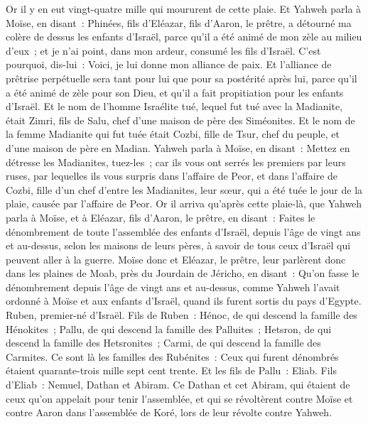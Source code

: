 \begin{multicols}{2}
Or il y en eut vingt-quatre mille qui moururent de cette plaie.
Et Yahweh parla à Moïse, en disant~:
Phinées, fils d'Eléazar, fils d'Aaron, le prêtre, a détourné ma colère de dessus les enfants d'Israël, parce qu'il a été animé de mon zèle au milieu d'eux~; et je n'ai point, dans mon ardeur, consumé les fils d'Israël.
C'est pourquoi, dis-lui~: Voici, je lui donne mon alliance de paix.
Et l'alliance de prêtrise perpétuelle sera tant pour lui que pour sa postérité après lui, parce qu'il a été animé de zèle pour son Dieu, et qu'il a fait propitiation pour les enfants d'Israël.
Et le nom de l'homme Israélite tué, lequel fut tué avec la Madianite, était Zimri, fils de Salu, chef d'une maison de père des Siméonites.
Et le nom de la femme Madianite qui fut tuée était Cozbi, fille de Tsur, chef du peuple, et d'une maison de père en Madian.
Yahweh parla à Moïse, en disant~:
Mettez en détresse les Madianites, tuez-les~;
car ils vous ont serrés les premiers par leurs ruses, par lequelles ils vous surpris dans l'affaire de Peor, et dans l'affaire de Cozbi, fille d'un chef d'entre les Madianites, leur sœur, qui a été tuée le jour de la plaie, causée par l'affaire de Peor.
\VerseOne{} Or il arriva qu'après cette plaie-là, que Yahweh parla à Moïse, et à Eléazar, fils d'Aaron, le prêtre, en disant~:
Faites le dénombrement de toute l'assemblée des enfants d'Israël, depuis l'âge de vingt ans et au-dessus, selon les maisons de leurs pères, à savoir de tous ceux d'Israël qui peuvent aller à la guerre.
Moïse donc et Eléazar, le prêtre, leur parlèrent donc dans les plaines de Moab, près du Jourdain de Jéricho, en disant~:
Qu'on fasse le dénombrement depuis l'âge de vingt ans et au-dessus, comme Yahweh l'avait ordonné à Moïse et aux enfants d'Israël, quand ils furent sortis du pays d'Egypte.
Ruben, premier-né d'Israël. Fils de Ruben~: Hénoc, de qui descend la famille des Hénokites~; Pallu, de qui descend la famille des Palluites~;
Hetsron, de qui descend la famille des Hetsronites~; Carmi, de qui descend la famille des Carmites.
Ce sont là les familles des Rubénites~: Ceux qui furent dénombrés étaient quarante-trois mille sept cent trente.
Et les fils de Pallu~: Eliab.
Fils d'Eliab~: Nemuel, Dathan et Abiram. Ce Dathan et cet Abiram, qui étaient de ceux qu'on appelait pour tenir l'assemblée, et qui se révoltèrent contre Moïse et contre Aaron dans l'assemblée de Koré, lors de leur révolte contre Yahweh.

\end{multicols}
